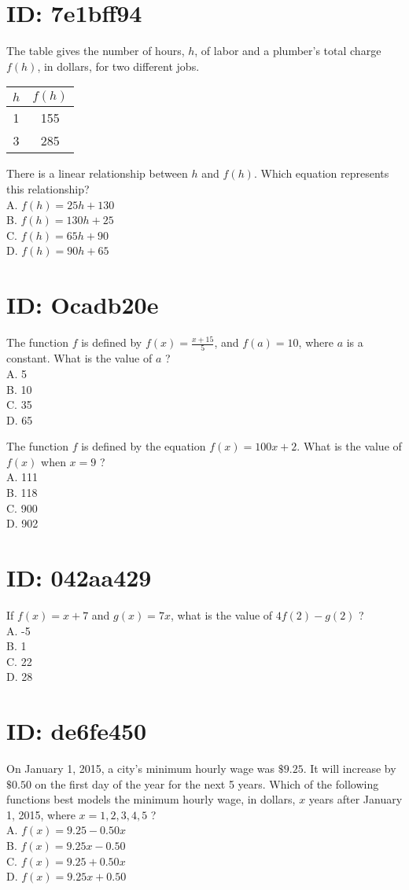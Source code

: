 \section*{ID: 7e1bff94}
The table gives the number of hours, $h$, of labor and a plumber's total charge $f(h)$, in dollars, for two different jobs.

\begin{center}
\begin{tabular}{|c|c|}
\hline
$h$ & $f(h)$ \\
\hline
1 & 155 \\
\hline
3 & 285 \\
\hline
\end{tabular}
\end{center}

There is a linear relationship between $h$ and $f(h)$. Which equation represents this relationship?\\
A. $f(h)=25 h+130$\\
B. $f(h)=130 h+25$\\
C. $f(h)=65 h+90$\\
D. $f(h)=90 h+65$

\section*{ID: Ocadb20e}
The function $f$ is defined by $f(x)=\frac{x+15}{5}$, and $f(a)=10$, where $a$ is a constant. What is the value of $a$ ?\\
A. 5\\
B. 10\\
C. 35\\
D. 65

The function $f$ is defined by the equation $f(x)=100 x+2$. What is the value of $f(x)$ when $x=9$ ?\\
A. 111\\
B. 118\\
C. 900\\
D. 902

\section*{ID: 042aa429}
If $f(x)=x+7$ and $g(x)=7 x$, what is the value of $4 f(2)-g(2)$ ?\\
A. -5\\
B. 1\\
C. 22\\
D. 28

\section*{ID: de6fe450}
On January 1, 2015, a city's minimum hourly wage was $\$ 9.25$. It will increase by $\$ 0.50$ on the first day of the year for the next 5 years. Which of the following functions best models the minimum hourly wage, in dollars, $x$ years after January 1, 2015, where $x=1,2,3,4,5$ ?\\
A. $f(x)=9.25-0.50 x$\\
B. $f(x)=9.25 x-0.50$\\
C. $f(x)=9.25+0.50 x$\\
D. $f(x)=9.25 x+0.50$

